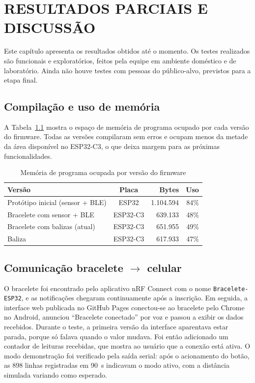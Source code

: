 \chapter{RESULTADOS PARCIAIS E DISCUSSÃO}
\label{cap:resultados}

Este capítulo apresenta os resultados obtidos até o momento. Os testes realizados são funcionais e exploratórios, feitos pela equipe em ambiente doméstico e de laboratório. Ainda não houve testes com pessoas do público-alvo, previstos para a etapa final.

\section{Compilação e uso de memória}
\label{sec:res-memoria}

A Tabela~\ref{tab:memoria} mostra o espaço de memória de programa ocupado por cada versão do firmware. Todas as versões compilaram sem erros e ocupam menos da metade da área disponível no ESP32-C3, o que deixa margem para as próximas funcionalidades.

\begin{table}[htb]
\centering
\caption{Memória de programa ocupada por versão do firmware}
\label{tab:memoria}
\small
\begin{tabular}{lcrr}
\toprule
\textbf{Versão} & \textbf{Placa} & \textbf{Bytes} & \textbf{Uso} \\
\midrule
Protótipo inicial (sensor + BLE) & ESP32 & 1.104.594 & 84\% \\
Bracelete com sensor + BLE & ESP32-C3 & 639.133 & 48\% \\
Bracelete com balizas (atual) & ESP32-C3 & 651.955 & 49\% \\
Baliza & ESP32-C3 & 617.933 & 47\% \\
\bottomrule
\end{tabular}
\normalsize
{}
\end{table}

\section{Comunicação bracelete $\rightarrow$ celular}
\label{sec:res-comunicacao}

O bracelete foi encontrado pelo aplicativo nRF Connect com o nome \texttt{Bracelete-ESP32}, e as notificações chegaram continuamente após a inscrição. Em seguida, a interface web publicada no GitHub Pages conectou-se ao bracelete pelo Chrome no Android, anunciou ``Bracelete conectado'' por voz e passou a exibir os dados recebidos. Durante o teste, a primeira versão da interface aparentava estar parada, porque só falava quando o valor mudava. Foi então adicionado um contador de leituras recebidas, que mostra ao usuário que a conexão está ativa. O modo demonstração foi verificado pela saída serial: após o acionamento do botão, as 898 linhas registradas em 90~s indicavam o modo ativo, com a distância simulada variando como esperado.

